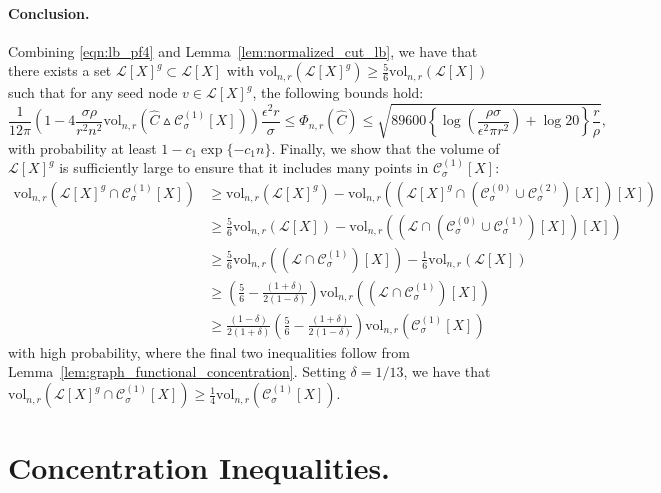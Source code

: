 \documentclass[11pt,twoside]{article}
\newcommand{\vol}{\mathrm{vol}}
\newcommand{\1}{\mathbf{1}}
\newcommand{\Xbf}{X}             %
\begin{document}
\paragraph{Conclusion.}
Combining \eqref{eqn:lb_pf4} and Lemma~\ref{lem:normalized_cut_lb}, we have that there exists a set $\mathcal{L}[\Xbf]^g \subset \mathcal{L}[\Xbf]$ with $\vol_{n,r}(\mathcal{L}[\Xbf]^g) \geq \frac{5}{6}\vol_{n,r}(\mathcal{L}[\Xbf])$ such that for any seed node $v \in \mathcal{L}[\Xbf]^g$, the following bounds hold:
\begin{equation*}
 \frac{1}{12\pi} \left(1 - 4\frac{\sigma \rho}{r^2 n^2} \vol_{n,r}(\widehat{C} \vartriangle \mathcal{C}_{\sigma}^{(1)}[\Xbf]) \right) \frac{\epsilon^2 r}{\sigma} \leq \Phi_{n,r}(\widehat{C}) \leq \sqrt{89600\left\{\log\left(\frac{\rho \sigma}{\epsilon^2 \pi r^2}\right) + \log 20\right\} \frac{r}{\rho}},
\end{equation*}
with probability at least $1 - c_1\exp\{-c_1 n\}$. Finally, we show that the volume of $\mathcal{L}[\Xbf]^g$ is sufficiently large to ensure that it includes many points in $\mathcal{C}_{\sigma}^{(1)}[\Xbf]$:
\begin{align*}
\vol_{n,r}(\mathcal{L}[\Xbf]^g \cap \mathcal{C}_{\sigma}^{(1)}[\Xbf]) & \geq  \vol_{n,r}(\mathcal{L}[\Xbf]^g) - \vol_{n,r}((\mathcal{L}[\Xbf]^g \cap (\mathcal{C}_{\sigma}^{(0)} \cup \mathcal{C}_{\sigma}^{(2)})[\Xbf])[\Xbf]) \\
& \geq \frac{5}{6}\vol_{n,r}(\mathcal{L}[\Xbf]) - \vol_{n,r}((\mathcal{L} \cap (\mathcal{C}_{\sigma}^{(0)} \cup \mathcal{C}_{\sigma}^{(1)})[\Xbf])[\Xbf]) \\
& \geq \frac{5}{6}\vol_{n,r}((\mathcal{L} \cap \mathcal{C}_{\sigma}^{(1)})[\Xbf]) - \frac{1}{6}\vol_{n,r}(\mathcal{L}[\Xbf]) \\
& \geq \left(\frac{5}{6} - \frac{(1 + \delta)}{2(1 - \delta)}\right)\vol_{n,r}((\mathcal{L} \cap \mathcal{C}_{\sigma}^{(1)})[\Xbf]) \\
& \geq \frac{(1 - \delta)}{2(1 + \delta)}\left(\frac{5}{6} - \frac{(1 + \delta)}{2(1 - \delta)}\right)\vol_{n,r}(\mathcal{C}_{\sigma}^{(1)}[\Xbf])
\end{align*}
with high probability, where the final two inequalities follow from Lemma~\ref{lem:graph_functional_concentration}. Setting $\delta = 1/13$, we have that $\vol_{n,r}(\mathcal{L}[\Xbf]^g \cap \mathcal{C}_{\sigma}^{(1)}[\Xbf]) \geq \frac{1}{4}\vol_{n,r}(\mathcal{C}_{\sigma}^{(1)}[\Xbf])$.

\section{Concentration Inequalities.}
\end{document}
